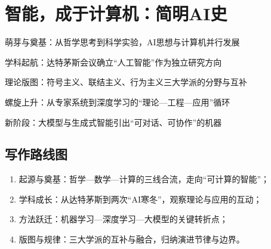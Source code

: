 \chapter{智能，成于计算机：简明AI史}



\begin{introduction}  
  \item 萌芽与奠基：从哲学思考到科学实验，AI思想与计算机并行发展
  \item 学科起航：达特茅斯会议确立“人工智能”作为独立研究方向
  \item 理论版图：符号主义、联结主义、行为主义三大学派的分野与互补
  \item 螺旋上升：从专家系统到深度学习的“理论—工程—应用”循环
  \item 新阶段：大模型与生成式智能引出“可对话、可协作”的机器
\end{introduction}



\section*{写作路线图}
\begin{enumerate}
  \item 起源与奠基：哲学—数学—计算的三线合流，走向“可计算的智能”；
  \item 学科成长：从达特茅斯到两次“AI寒冬”，观察理论与应用的互动；
  \item 方法跃迁：机器学习—深度学习—大模型的关键转折点；
  \item 版图与规律：三大学派的互补与融合，归纳演进节律与边界。
\end{enumerate}


